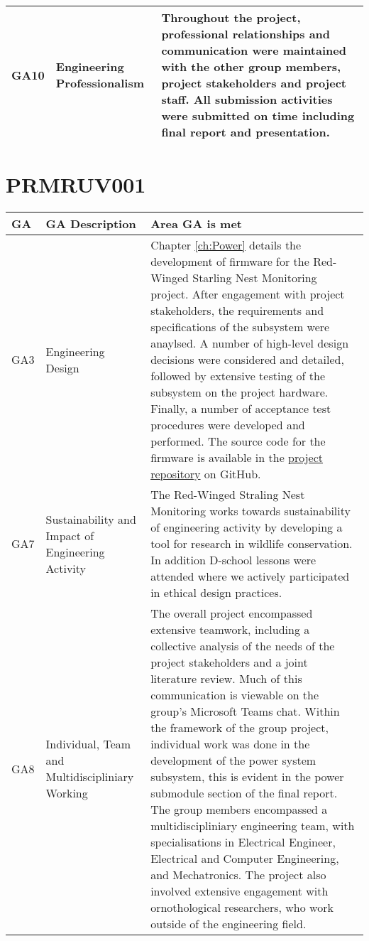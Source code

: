 \documentclass[class=report,11pt,crop=false]{standalone}
\begin{document}
\begin{tabularx}{\textwidth}{|p{} p{} X|}
    GA10 & Engineering Professionalism & Throughout the project, professional relationships and communication were maintained with the other group members, project stakeholders and project staff. All submission activities were submitted on time including final report and presentation.  \\ \hline


\end{tabularx}
\raggedright


\section{PRMRUV001}

\centering
\begin{tabularx}{\textwidth}{|p{} p{} X|}

    \hline
    \textbf{GA} & \textbf{GA Description} & \textbf{Area GA is met} \\ \hline

    GA3 & Engineering Design & Chapter \ref{ch:Power} details the development of firmware for the Red-Winged Starling Nest Monitoring project. After engagement with project stakeholders, the requirements and specifications of the subsystem were anaylsed. A number of high-level design decisions were considered and detailed, followed by extensive testing of the subsystem on the project hardware. Finally, a number of acceptance test procedures were developed and performed. The source code for the firmware is available in the \href{https://github.com/rothdu/EEE4113F-Group13-2024}{project repository} on GitHub. \\ \hline

    GA7 & Sustainability and Impact of Engineering Activity & The Red-Winged Straling Nest Monitoring works towards sustainability of engineering activity by developing a tool for research in wildlife conservation. In addition D-school lessons were attended where we actively participated in ethical design practices. \\ \hline

    GA8 & Individual, Team and Multidiscipliniary Working & The overall project encompassed extensive teamwork, including a collective analysis of the needs of the project stakeholders and a joint literature review. Much of this communication is viewable on the group's Microsoft Teams chat. Within the framework of the group project, individual work was done in the development of the power system subsystem, this is evident in the power submodule section of the final report. The group members encompassed a multidiscipliniary engineering team, with specialisations in Electrical Engineer, Electrical and Computer Engineering, and Mechatronics. The project also involved extensive engagement with ornothological researchers, who work outside of the engineering field. \\ \hline


\end{tabularx}
\end{document}
